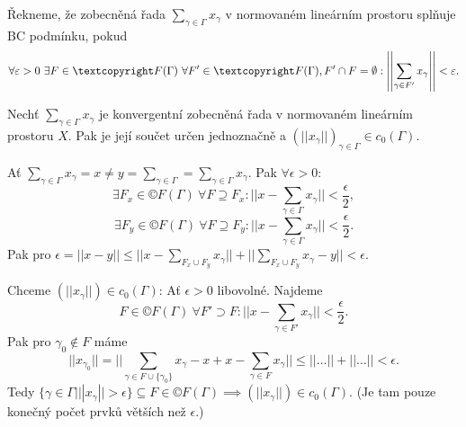 \documentclass[12pt]{article}					%
\begin{document}
\begin{definice}
	Řekneme, že zobecněná řada $\sum_{\gamma \in \Gamma} x_\gamma$ v normovaném lineárním prostoru splňuje BC podmínku, pokud
	$$ \forall \epsilon > 0\ \exists F \in ©F(\Gamma)\ \forall F' \in ©F(\Gamma), F' \cap F = \O: \left|\left| \sum_{\gamma \in F'} x_\gamma \right|\right| < \epsilon. $$
\end{definice}

\begin{veta}
	Nechť $\sum_{\gamma \in \Gamma} x_\gamma$ je konvergentní zobecněná řada v normovaném lineárním prostoru $X$. Pak je její součet určen jednoznačně a $(||x_\gamma||)_{\gamma \in \Gamma} \in c_0(\Gamma)$.

	\begin{dukazin}[Jednoznačnost]
		Ať $\sum_{\gamma \in \Gamma} x_\gamma = x ≠ y = \sum_{\gamma \in \Gamma} = \sum_{\gamma \in \Gamma}x_\gamma$. Pak $\forall \epsilon > 0$:
		$$ \exists F_x \in ©F(\Gamma)\ \forall F \supseteq F_x: ||x - \sum_{\gamma \in \Gamma} x_\gamma|| < \frac{\epsilon}{2}, $$
		$$ \exists F_y \in ©F(\Gamma)\ \forall F \supseteq F_y: ||x - \sum_{\gamma \in \Gamma} x_\gamma|| < \frac{\epsilon}{2}. $$
		Pak pro $\epsilon = ||x - y|| ≤ ||x - \sum_{F_x \cup F_y} x_\gamma || + ||\sum_{F_x \cup F_y} x_\gamma - y|| < \epsilon$. \lightning
	\end{dukazin}

	\begin{dukazin}[Existence]
		Chceme $(||x_\gamma||) \in c_0(\Gamma)$: Ať $\epsilon > 0$ libovolné. Najdeme 
		$$ F \in ©F(\Gamma)\ \forall F' \supset F: ||x - \sum_{\gamma \in F'}x_\gamma || < \frac{\epsilon}{2}. $$
		Pak pro $\gamma_0 \notin F$ máme
		$$ ||x_{\gamma_0}|| = ||\sum_{\gamma \in F \cup \{\gamma_0\}} x_\gamma - x + x - \sum_{\gamma \in F}x_\gamma|| ≤ ||…|| + ||…|| < \epsilon. $$
		Tedy $\{\gamma \in \Gamma | ||x_\gamma|| > \epsilon\} \subseteq F \in ©F(\Gamma) \implies (||x_\gamma||) \in c_0(\Gamma)$. (Je tam pouze konečný počet prvků větších než $\epsilon$.)
	\end{dukazin}
\end{veta}
\end{document}
